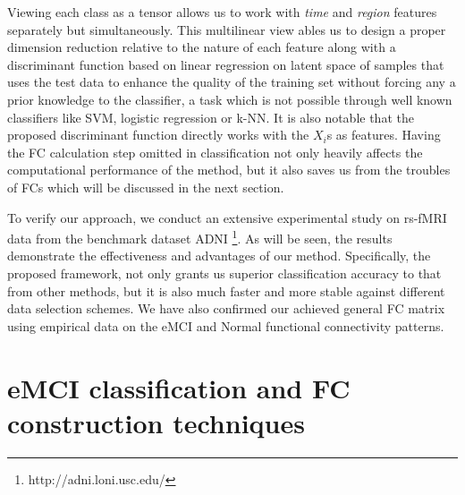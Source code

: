\documentclass[preprint,12pt]{elsarticle}
\begin{document}
	Viewing each class as a tensor allows us to work with \textit{time} and \textit{region} features separately but simultaneously. This multilinear view
	ables us to design a proper dimension reduction relative to the nature of each feature along with a discriminant function based on linear regression on latent space of samples that uses the test data to enhance the quality of the training set without forcing any a prior knowledge to the classifier, a task which is not possible through well known classifiers like SVM, logistic regression or k-NN. It is also notable that the proposed discriminant function directly works with the $X_i$s as features. Having the FC calculation step omitted in classification not only heavily affects the computational performance of the method, but it also saves us from the troubles of FCs which will be discussed in the next section.   
	
	To verify our approach, we conduct an extensive experimental study on rs-fMRI data from the
	benchmark dataset ADNI
	\footnote{http://adni.loni.usc.edu/}.
	As will be seen, the results demonstrate the effectiveness and advantages of our method. Specifically, the proposed framework, not only grants us superior classification accuracy to that from other methods, but it is also much faster and more stable against different data selection schemes. We have also confirmed our achieved general FC matrix using empirical data on the eMCI and Normal functional connectivity patterns.							 
	\section{eMCI classification and FC construction techniques}\label{related_works}
	
\end{document}

